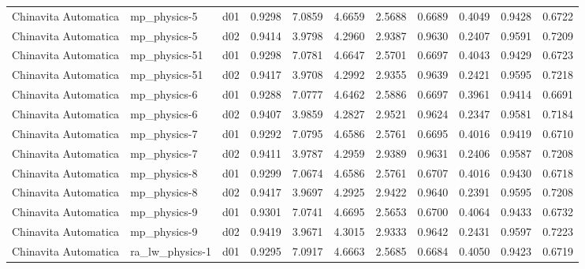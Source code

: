 \begin{longtable}{lllrrrrrrrr}
 Chinavita Automatica  &          mp\_physics-5 &     d01 &   0.9298 &   7.0859 &   4.6659 &       2.5688 &        0.6689 &       0.4049 &           0.9428 &  0.6722 \\
 Chinavita Automatica  &          mp\_physics-5 &     d02 &   0.9414 &   3.9798 &   4.2960 &       2.9387 &        0.9630 &       0.2407 &           0.9591 &  0.7209 \\
 Chinavita Automatica  &         mp\_physics-51 &     d01 &   0.9298 &   7.0781 &   4.6647 &       2.5701 &        0.6697 &       0.4043 &           0.9429 &  0.6723 \\
 Chinavita Automatica  &         mp\_physics-51 &     d02 &   0.9417 &   3.9708 &   4.2992 &       2.9355 &        0.9639 &       0.2421 &           0.9595 &  0.7218 \\
 Chinavita Automatica  &          mp\_physics-6 &     d01 &   0.9288 &   7.0777 &   4.6462 &       2.5886 &        0.6697 &       0.3961 &           0.9414 &  0.6691 \\
 Chinavita Automatica  &          mp\_physics-6 &     d02 &   0.9407 &   3.9859 &   4.2827 &       2.9521 &        0.9624 &       0.2347 &           0.9581 &  0.7184 \\
 Chinavita Automatica  &          mp\_physics-7 &     d01 &   0.9292 &   7.0795 &   4.6586 &       2.5761 &        0.6695 &       0.4016 &           0.9419 &  0.6710 \\
 Chinavita Automatica  &          mp\_physics-7 &     d02 &   0.9411 &   3.9787 &   4.2959 &       2.9389 &        0.9631 &       0.2406 &           0.9587 &  0.7208 \\
 Chinavita Automatica  &          mp\_physics-8 &     d01 &   0.9299 &   7.0674 &   4.6586 &       2.5761 &        0.6707 &       0.4016 &           0.9430 &  0.6718 \\
 Chinavita Automatica  &          mp\_physics-8 &     d02 &   0.9417 &   3.9697 &   4.2925 &       2.9422 &        0.9640 &       0.2391 &           0.9595 &  0.7208 \\
 Chinavita Automatica  &          mp\_physics-9 &     d01 &   0.9301 &   7.0741 &   4.6695 &       2.5653 &        0.6700 &       0.4064 &           0.9433 &  0.6732 \\
 Chinavita Automatica  &          mp\_physics-9 &     d02 &   0.9419 &   3.9671 &   4.3015 &       2.9333 &        0.9642 &       0.2431 &           0.9597 &  0.7223 \\
 Chinavita Automatica  &       ra\_lw\_physics-1 &     d01 &   0.9295 &   7.0917 &   4.6663 &       2.5685 &        0.6684 &       0.4050 &           0.9423 &  0.6719 \\

\end{longtable}
